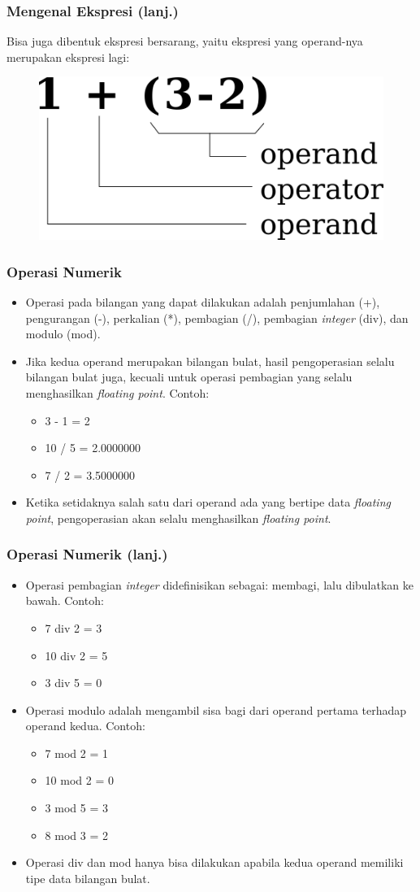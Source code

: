 \begin{frame}
\frametitle{Mengenal Ekspresi (lanj.)}
Bisa juga dibentuk ekspresi bersarang, yaitu ekspresi yang operand-nya merupakan ekspresi lagi:
\begin{figure}
  \centering
  \includegraphics[width=5 cm]{asset/ekspresi-nested.png}
\end{figure}
\end{frame}

\begin{frame}
\frametitle{Operasi Numerik}
\begin{itemize}
  \item Operasi pada bilangan yang dapat dilakukan adalah penjumlahan (+), pengurangan (-), perkalian (*), pembagian (/), pembagian \textit{integer} (div), dan modulo (mod).
  \item Jika kedua operand merupakan bilangan bulat, hasil pengoperasian selalu bilangan bulat juga, kecuali untuk operasi pembagian yang selalu menghasilkan \textit{floating point}. Contoh:
  \begin{itemize}
    \item 3 - 1 = 2
    \item 10 / 5 = 2.0000000
    \item 7 / 2 = 3.5000000
  \end{itemize}
  \item Ketika setidaknya salah satu dari operand ada yang bertipe data \textit{floating point}, pengoperasian akan selalu menghasilkan \textit{floating point}.
\end{itemize}
\end{frame}

\begin{frame}
\frametitle{Operasi Numerik (lanj.)}
\begin{itemize}
  \item Operasi pembagian \textit{integer} didefinisikan sebagai: membagi, lalu dibulatkan ke bawah. Contoh:
  \begin{itemize}
    \item 7 div 2 = 3
    \item 10 div 2 = 5
    \item 3 div 5 = 0
  \end{itemize}
  \item Operasi modulo adalah mengambil sisa bagi dari operand pertama terhadap operand kedua. Contoh:
  \begin{itemize}
    \item 7 mod 2 = 1
    \item 10 mod 2 = 0
    \item 3 mod 5 = 3
    \item 8 mod 3 = 2
  \end{itemize}
  \item Operasi div dan mod hanya bisa dilakukan apabila kedua operand memiliki tipe data \alert{bilangan bulat}.
\end{itemize}
\end{frame}

